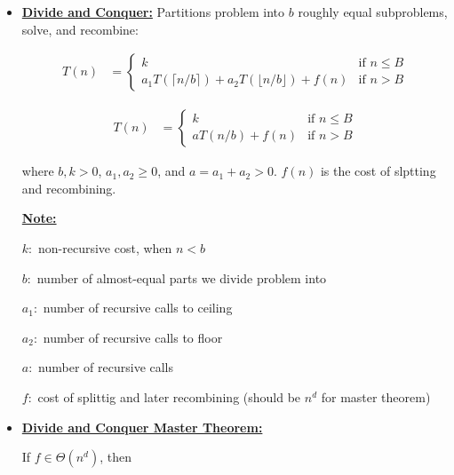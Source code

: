 \documentclass[12pt]{article}
\begin{document}
\begin{itemize}
    \item

    \underline{\textbf{Divide and Conquer:}} Partitions problem into $b$ roughly
    equal subproblems, solve, and recombine:

    \bigskip

    \begin{align}
        T(n) &= \begin{cases}
        k & \text{if $n \leq B$}\\
        a_1T(\lceil n/b \rceil) + a_2T(\lfloor n/b \rfloor) + f(n) & \text{if $n > B$}
        \end{cases}
    \end{align}

    \begin{align}
        T(n) &= \begin{cases}
        k & \text{if $n \leq B$}\\
        aT(n/b) + f(n) & \text{if $n > B$}
        \end{cases}
    \end{align}

    \bigskip

    where $b,k > 0$, $a_1,a_2 \geq 0$, and $a = a_1 + a_2 > 0$. $f(n)$ is the
    cost of slptting and recombining.

    \bigskip

    \begin{mdframed}
    \underline{\textbf{Note:}}

    \bigskip

    $k:$ non-recursive cost, when $n < b$

    $b:$ number of almost-equal parts we divide problem into

    $a_1:$ number of recursive calls to ceiling

    $a_2:$ number of recursive calls to floor

    $a:$ number of recursive calls

    $f:$ cost of splittig and later recombining (should be $n^d$ for master theorem)
    \end{mdframed}

    \item

    \underline{\textbf{Divide and Conquer Master Theorem:}}

    \bigskip

    If $f \in \Theta(n^d)$, then


\end{itemize}
\end{document}
